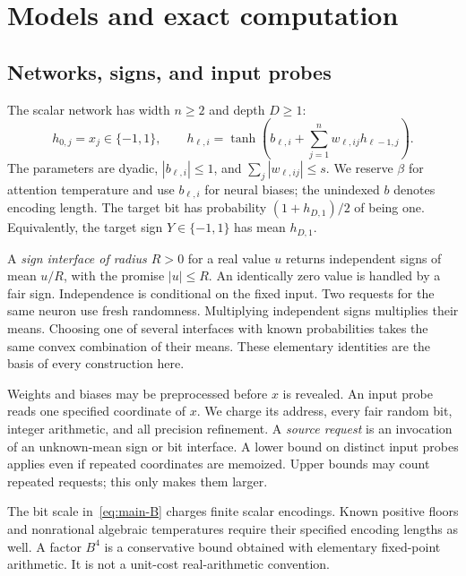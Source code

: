 \documentclass[11pt]{article}
\theoremstyle{definition}
\theoremstyle{remark}
\numberwithin{equation}{section}
\begin{document}
\section{Models and exact computation}
\label{sec:models}

\subsection{Networks, signs, and input probes}

The scalar network has width $n\ge2$ and depth $D\ge1$:
\begin{equation}
 h_{0,j}=x_j\in\{-1,1\},\qquad
 h_{\ell,i}=\tanh\!\left(b_{\ell,i}
             +\sum_{j=1}^n w_{\ell,ij}h_{\ell-1,j}\right).
 \label{eq:main-network}
\end{equation}
The parameters are dyadic, $|b_{\ell,i}|\le1$, and
$\sum_j|w_{\ell,ij}|\le s$. We reserve $\beta$ for attention
temperature and use $b_{\ell,i}$ for neural biases; the unindexed $b$ denotes encoding length. The target bit
has probability $(1+h_{D,1})/2$ of being one. Equivalently, the
target sign $Y\in\{-1,1\}$ has mean $h_{D,1}$.

A \emph{sign interface of radius $R>0$} for a real value $u$ returns
independent signs of mean $u/R$, with the promise $|u|\le R$.
An identically zero value is handled by a fair sign. Independence is conditional on the fixed input. Two requests for the
same neuron use fresh randomness. Multiplying independent signs
multiplies their means. Choosing one of several interfaces with known
probabilities takes the same convex combination of their means.
These elementary identities are the basis of every construction here.

Weights and biases may be preprocessed before $x$ is revealed.
An input probe reads one specified coordinate of $x$. We charge its
address, every fair random bit, integer arithmetic, and all precision
refinement. A \emph{source request} is an invocation of an unknown-mean
sign or bit interface. A lower bound on distinct input probes applies
even if repeated coordinates are memoized. Upper bounds may count
repeated requests; this only makes them larger.

The bit scale in~\eqref{eq:main-B} charges finite scalar encodings.
Known positive floors and nonrational algebraic temperatures require
their specified encoding lengths as well. A factor $B^4$ is a
conservative bound obtained with elementary fixed-point arithmetic.
It is not a unit-cost real-arithmetic convention.
\end{document}
